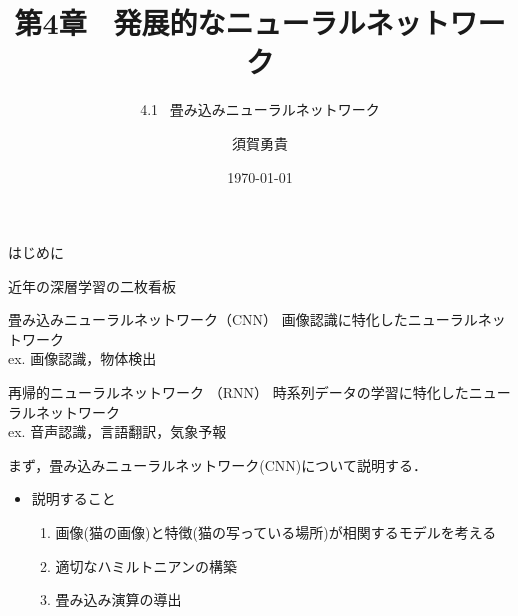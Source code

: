 \documentclass[dvipdfmx,8pt]{beamer}
\title{第4章 \ 発展的なニューラルネットワーク}
\subtitle{4.1 \ 畳み込みニューラルネットワーク}
\author[須賀]{須賀勇貴}
\institute[茨大]{茨城大学理工学研究科}
\date{\today}
\begin{document}
\frame{\maketitle}

  \begin{frame}{はじめに}
    
    近年の深層学習の二枚看板

    \begin{block}{畳み込みニューラルネットワーク（CNN）}
      画像認識に特化したニューラルネットワーク\\
      ex. 画像認識，物体検出
    \end{block}

    \begin{block}{再帰的ニューラルネットワーク （RNN）}
      時系列データの学習に特化したニューラルネットワーク\\
      ex. 音声認識，言語翻訳，気象予報
    \end{block}
    まず，畳み込みニューラルネットワーク(CNN)について説明する．\\
    \begin{itemize}
      \item 説明すること
      \begin{enumerate}
        \item 画像(猫の画像)と特徴(猫の写っている場所)が相関するモデルを考える
        \item 適切なハミルトニアンの構築
        \item 畳み込み演算の導出
      \end{enumerate}
    \end{itemize}

  \end{frame}
\end{document}
